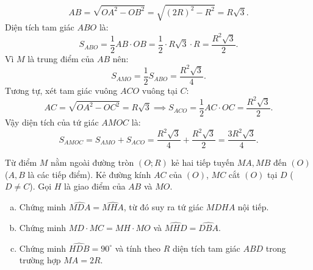 \begin{bt}
{\begin{enumerate}[a)]
		$$AB = \sqrt{OA^2 - OB^2} = \sqrt{(2R)^2 - R^2} = R\sqrt{3}.$$
		Diện tích tam giác $ABO$ là:
		$$S_{ABO} = \frac{1}{2} AB \cdot OB = \frac{1}{2} \cdot R\sqrt{3} \cdot R = \frac{R^2\sqrt{3}}{2}.$$
		Vì $M$ là trung điểm của $AB$ nên:
		$$S_{AMO} = \frac{1}{2} S_{ABO} = \frac{R^2\sqrt{3}}{4}.$$
		Tương tự, xét tam giác vuông $ACO$ vuông tại $C$:
		$$AC = \sqrt{OA^2 - OC^2} = R\sqrt{3} \implies S_{ACO} = \frac{1}{2} AC \cdot OC = \frac{R^2\sqrt{3}}{2}.$$
		Vậy diện tích của tứ giác $AMOC$ là:
		$$S_{AMOC} = S_{AMO} + S_{ACO} = \frac{R^2\sqrt{3}}{4} + \frac{R^2\sqrt{3}}{2} = \frac{3R^2\sqrt{3}}{4}.$$
	\end{enumerate}
}
\end{bt}

\begin{bt}%
Từ điểm $M$ nằm ngoài đường tròn $(O; R)$ kẻ hai tiếp tuyến $MA, MB$ đến $(O)$ ($A, B$ là các tiếp điểm). Kẻ đường kính $AC$ của $(O)$, $MC$ cắt $(O)$ tại $D$ ($D \neq C$). Gọi $H$ là giao điểm của $AB$ và $MO$.
\begin{enumerate}[a)]
	\item Chứng minh $\widehat{MDA} = \widehat{MHA}$, từ đó suy ra tứ giác $MDHA$ nội tiếp.
	\item Chứng minh $MD \cdot MC = MH \cdot MO$ và $\widehat{MHD} = \widehat{DBA}$.
	\item Chứng minh $\widehat{HDB} = 90^\circ$ và tính theo $R$ diện tích tam giác $ABD$ trong trường hợp $MA = 2R$.
\end{enumerate}
\end{bt}
